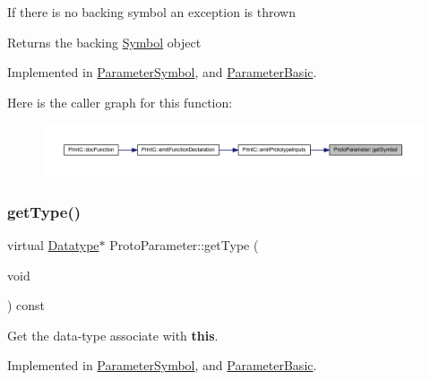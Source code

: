 If there is no backing symbol an exception is thrown \begin{DoxyReturn}{Returns}
the backing \mbox{\hyperlink{class_symbol}{Symbol}} object 
\end{DoxyReturn}


Implemented in \mbox{\hyperlink{class_parameter_symbol_a4ad5640e944e78b0e02679503ee27534}{Parameter\+Symbol}}, and \mbox{\hyperlink{class_parameter_basic_ae3b74f1e127c354b6baabf69d2f36056}{Parameter\+Basic}}.

Here is the caller graph for this function\+:
\nopagebreak
\begin{figure}[H]
\begin{center}
\leavevmode
\includegraphics[width=350pt]{class_proto_parameter_afb4a7192eb2e8449b47d85073b3d82e6_icgraph}
\end{center}
\end{figure}
\mbox{\label{class_proto_parameter_a05bfe5b4fe563c1e4e93bf2648239061}} 
\subsubsection{\texorpdfstring{getType()}{getType()}}
{\footnotesize\ttfamily virtual \mbox{\hyperlink{class_datatype}{Datatype}}$\ast$ Proto\+Parameter\+::get\+Type (\begin{DoxyParamCaption}\item[{void}]{ }\end{DoxyParamCaption}) const\hspace{0.3cm}{\ttfamily [pure virtual]}}



Get the data-\/type associate with {\bfseries{this}}. 



Implemented in \mbox{\hyperlink{class_parameter_symbol_aec9aa765fcdb4e21f4fd223573e802b3}{Parameter\+Symbol}}, and \mbox{\hyperlink{class_parameter_basic_a0120ba1a51396ed32a1ff0638f795146}{Parameter\+Basic}}.

